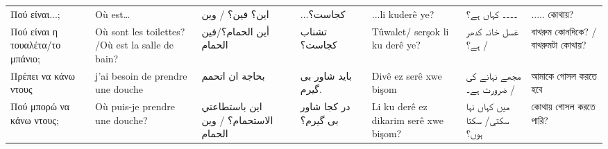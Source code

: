 \begin{longtable}{p{3.5cm} p{3.5cm} p{3.5cm} p{3.5cm} p{3.5cm} p{3.5cm} p{3.5cm} }
 Πού είναι...;                                                                                                                 & Où est…                                                                                         & این؟ فین؟                   / وين                                                     & ...کجاست؟                                                   & ...li kuderê ye?                                                                   & ۔۔۔۔ کہاں ہے؟                                                                  & ..... কোথায়?                                                      \\
 Πού είναι η τουαλέτα/το μπάνιο;                                                                                               & Où sont les toilettes? /Où est la salle de bain?                                                & أين الحمام؟/فین الحمام                                                                & تشناب کجاست؟                                                & Tûwalet/ serşok li ku derê ye?                                                     & غسل خانہ کدھر ہے؟ /                                                            & বাথরুম কোনদিকে? / বাথরুমটা  কোথায়?                                \\
 Πρέπει να κάνω ντους                                                                                                          & j'ai besoin de prendre une douche                                                               & بحاجة ان اتحمم                                                                        & باید شاور بی گیرم.                                          & Divê ez serê xwe bişom                                                             & مجھے نہانے کی ضرورت ہے۔ /                                                      & আমাকে গোসল করতে হবে                                               \\
 Πού μπορώ να κάνω ντους;                                                                                                      & Où puis-je prendre une douche?                                                                  & اين باستطاعتي الاستحمام؟              / وين الحمام                                    & در کجا شاور بی گیرم؟                                        & Li ku derê ez dikarim serê xwe bişom?                                              & میں کہاں نہا سکتی/ سکتا ہوں؟                                                   & কোথায় গোসল করতে পারি?                                             \\

\end{longtable}
